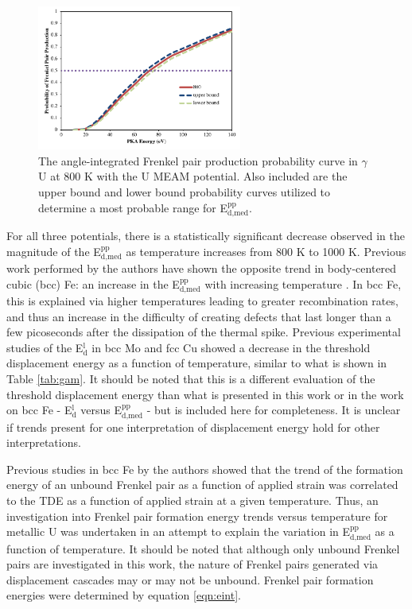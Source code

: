 \documentclass[review]{elsarticle}
\begin{document}
\begin{figure}[h]
 \centering
 \includegraphics[width=0.6\textwidth]{plus_minusA.png} 
 \caption{The angle-integrated Frenkel pair production probability curve in $\gamma$U at 800 K with the U MEAM potential. Also included are the upper bound and lower bound probability curves utilized to determine a most probable range for E$^{\textrm{pp}}_{\textrm{d,med}}$.}
 \label{fig:errs}
\end{figure}



\FloatBarrier

For all three potentials, there is a statistically significant decrease observed in the magnitude of the E$^{\textrm{pp}}_{\textrm{d,med}}$ as temperature increases from 800 K to 1000 K. Previous work performed by the authors have shown the opposite trend in body-centered cubic (bcc) Fe: an increase in the E$^{\textrm{pp}}_{\textrm{d,med}}$ with increasing temperature \cite{beeler2016}. In bcc Fe, this is explained via higher temperatures leading to greater recombination rates, and thus an increase in the difficulty of creating defects that last longer than a few picoseconds after the dissipation of the thermal spike. Previous experimental studies of the E$^{\textrm{l}}_{\textrm{d}}$ in bcc Mo \cite{zag1983} and fcc Cu\cite{yoshida1979} showed a decrease in the threshold displacement energy as a function of temperature, similar to what is shown in Table \ref{tab:gam}. It should be noted that this is a different evaluation of the threshold displacement energy than what is presented in this work or in the work on bcc Fe \cite{beeler2016}- E$^{\textrm{l}}_{\textrm{d}}$ versus E$^{\textrm{pp}}_{\textrm{d,med}}$ - but is included here for completeness. It is unclear if trends present for one interpretation of displacement energy hold for other interpretations. 

Previous studies in bcc Fe \cite{beeler2015, beeler2016} by the authors showed that the trend of the formation energy of an unbound Frenkel pair as a function of applied strain was correlated to the TDE as a function of applied strain at a given temperature. Thus, an investigation into Frenkel pair formation energy trends versus temperature for metallic U was undertaken in an attempt to explain the variation in E$^{\textrm{pp}}_{\textrm{d,med}}$ as a function of temperature. It should be noted that although only unbound Frenkel pairs are investigated in this work, the nature of Frenkel pairs generated via displacement cascades may or may not be unbound. Frenkel pair formation energies were determined by equation \ref{eqn:eint}.
\end{document}

